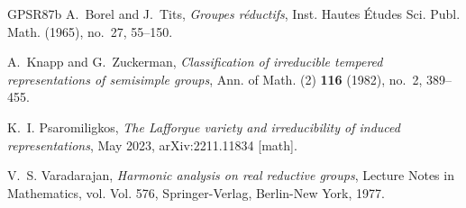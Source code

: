 \documentclass[iccmp]{ipbook}
\begin{document}
\begin{thebibliography}{GPSR87b}
A.~Borel and J.~Tits, \emph{Groupes r\'eductifs}, Inst. Hautes \'Etudes Sci.
  Publ. Math. (1965), no.~27, 55--150.

A.~Knapp and G.~Zuckerman, \emph{Classification of irreducible tempered
  representations of semisimple groups}, Ann. of Math. (2) \textbf{116} (1982),
  no.~2, 389--455.

K.~I. Psaromiligkos, \emph{The {Lafforgue} variety and irreducibility of
  induced representations}, May 2023, arXiv:2211.11834 [math].

V.~S. Varadarajan, \emph{Harmonic analysis on real reductive groups}, Lecture
  Notes in Mathematics, vol. Vol. 576, Springer-Verlag, Berlin-New York, 1977.

\end{thebibliography}
\end{document}

